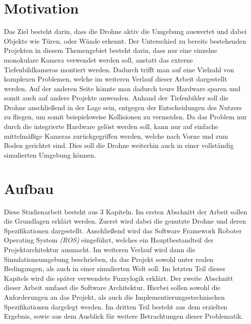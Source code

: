 \section{Motivation}
Das Ziel besteht darin, dass die Drohne aktiv die Umgebung auswertet und dabei Objekte wie Türen, oder Wände erkennt. Der Unterschied zu bereits bestehenden Projekten in diesem Themengebiet besteht darin, dass nur eine einzelne monokulare Kamera verwendet werden soll, anstatt das externe Tiefenbildkameras montiert werden. \newline
Dadurch trifft man auf eine Vielzahl von komplexen Problemen, welche im weiteren Verlauf dieser Arbeit dargestellt werden. Auf der anderen Seite könnte man dadurch teure Hardware sparen und somit auch auf andere Projekte anwenden. \newline
Anhand der Tiefenbilder soll die Drohne anschließend in der Lage sein, entgegen der Entscheidungen des Nutzers zu fliegen, um somit beispielsweise Kollisionen zu vermeiden. \newline
Da das Problem nur durch die integrierte Hardware gelöst werden soll, kann nur auf einfache mittelmäßige Kameras zurückgegriffen werden, welche nach Vorne und zum Boden gerichtet sind.
Dies soll die Drohne weiterhin auch in einer vollständig simulierten Umgebung können.




\section{Aufbau}
Diese Studienarbeit besteht aus 3 Kapiteln. Im ersten Abschnitt der Arbeit sollen die Grundlagen erklärt werden. Zuerst wird dabei die genutzte Drohne und deren Spezifikationen dargestellt. \newline
Anschließend wird das Software Framework Roboter Operating System \emph{(ROS)} eingeführt, welches ein Hauptbestandteil der Projektarchitektur ausmacht.\newline
Im weiteren Verlauf wird dann die Simulationsumgebung beschrieben, da das Projekt sowohl unter realen Bedingungen, als auch in einer simulierten Welt soll. 
Im letzten Teil dieses Kapitels wird die später verwendete Fuzzylogik erklärt. \newline
Der zweite Abschnitt dieser Arbeit umfasst die Software Architektur. Hierbei sollen sowohl die Anforderungen an das Projekt, als auch die Implementierungsstechnischen Spezifikationen dargelegt werden.
Im dritten Teil besteht aus dem erzielten Ergebnis, sowie aus dem Ausblick für weitere Betrachtungen dieser Problematik.

